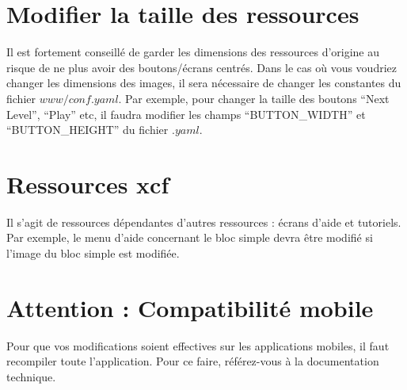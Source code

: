 \documentclass[11pt, english]{article}
\begin{document}
\section{Modifier la taille des ressources}
Il est fortement conseillé de garder les dimensions des ressources d'origine au risque de ne plus avoir des boutons/écrans centrés. Dans le cas où vous voudriez changer les dimensions des images, il sera nécessaire de changer les constantes du fichier $www/conf.yaml$. Par exemple, pour changer la taille des boutons \enquote{Next Level}, \enquote{Play} etc, il faudra modifier les champs \enquote{BUTTON\_WIDTH} et \enquote{BUTTON\_HEIGHT} du fichier $.yaml$.

\section{Ressources xcf}
Il s'agit de ressources dépendantes d'autres ressources : écrans d'aide et tutoriels. Par exemple, le menu d'aide concernant le bloc simple devra être modifié si l'image du bloc simple est modifiée. 

\section{Attention : Compatibilité mobile}
Pour que vos modifications soient effectives sur les applications mobiles, il faut recompiler toute l'application. Pour ce faire, référez-vous à la documentation technique.
\end{document}
